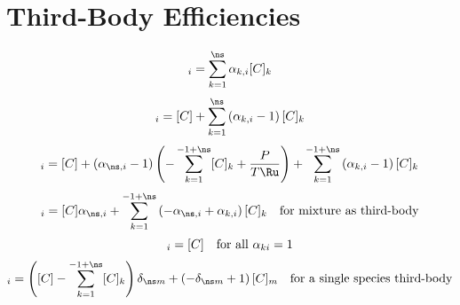 \documentclass[a4paper,10pt]{article}
\begin{document}
\section{Third-Body Efficiencies}
\begin{dmath} [X]_{i} = \sum_{k=1}^{\ns} \alpha_{k,i} [C]_{k}\end{dmath} 
\begin{dmath} [X]_{i} = [C] + \sum_{k=1}^{\ns} \left(\alpha_{k,i} - 1\right) [C]_{k}\end{dmath} 
\begin{dmath} [X]_{i} = [C] + \left(\alpha_{\ns,i} - 1\right) \left(- \sum_{k=1}^{-1 + \ns} [C]_{k} + \frac{P}{T \Ru}\right) + \sum_{k=1}^{-1 + \ns} \left(\alpha_{k,i} - 1\right) [C]_{k}\end{dmath} 
\begin{dmath} [X]_{i}=[C] \alpha_{\ns,i} + \sum_{k=1}^{-1 + \ns} \left(- \alpha_{\ns,i} + \alpha_{k,i}\right) [C]_{k}\text{\quad for mixture as third-body}\end{dmath} 
\begin{dmath} [X]_{i}=[C]\text{\quad for all $\alpha_{ki} = 1$}\end{dmath} 
\begin{dmath} [X]_{i}=\left([C] - \sum_{k=1}^{-1 + \ns} [C]_{k}\right) \delta_{\ns m} + \left(- \delta_{\ns m} + 1\right) [C]_{m}\text{\quad for a single species third-body}\end{dmath} 
\end{document}
